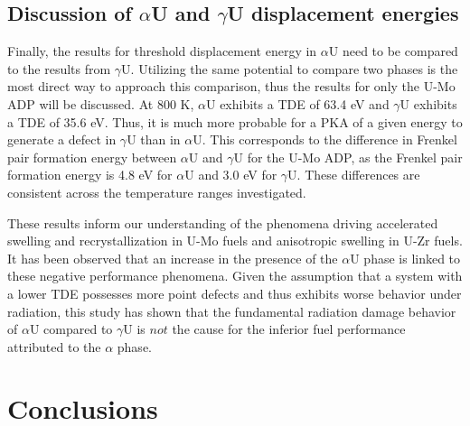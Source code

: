 \documentclass[review]{elsarticle}
\begin{document}
\subsection{Discussion of $\alpha$U and $\gamma$U displacement energies}

Finally, the results for threshold displacement energy in $\alpha$U need to be compared to the results from $\gamma$U. Utilizing the same potential to compare two phases is the most direct way to approach this comparison, thus the results for only the U-Mo ADP will be discussed. At 800 K, $\alpha$U exhibits a TDE of 63.4 eV and $\gamma$U exhibits a TDE of 35.6 eV. Thus, it is much more probable for a PKA of a given energy to generate a defect in $\gamma$U than in $\alpha$U. This corresponds to the difference in Frenkel pair formation energy between $\alpha$U and $\gamma$U for the U-Mo ADP, as the Frenkel pair formation energy is 4.8 eV for $\alpha$U and 3.0 eV for $\gamma$U. These differences are consistent across the temperature ranges investigated.

These results inform our understanding of the phenomena driving accelerated swelling and recrystallization in U-Mo fuels and anisotropic swelling in U-Zr fuels. It has been observed that an increase in the presence of the $\alpha$U phase is linked to these negative performance phenomena. Given the assumption that a system with a lower TDE possesses more point defects and thus exhibits worse behavior under radiation, this study has shown that the fundamental radiation damage behavior of $\alpha$U compared to $\gamma$U is $\textit{not}$ the cause for the inferior fuel performance attributed to the $\alpha$ phase.

\FloatBarrier

\section{Conclusions}
\end{document}
